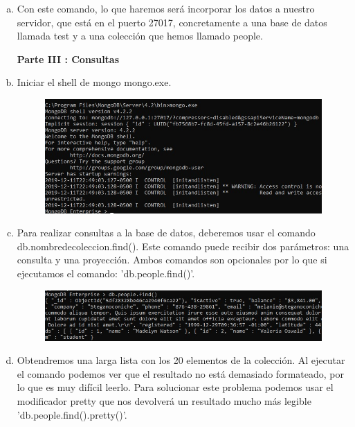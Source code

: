\documentclass[preprint,12pt]{elsarticle}
\begin{document}
\begin{enumerate}[a)]
\item Con este comando, lo que haremos será incorporar los datos a nuestro servidor, que está en el puerto 27017, concretamente a una base de datos llamada test y a una colección que hemos llamado people.\newline

\textbf{Parte III : Consultas}
\item Iniciar el shell de mongo mongo.exe. \newline
\begin{figure}[htb]
	\begin{center}
		\includegraphics[width=13cm]{./IMAGENES/Mongo05}
	\end{center}
\end{figure}

\item Para realizar consultas a la base de datos, deberemos usar el comando db.nombredecoleccion.find(). Este comando puede recibir dos parámetros: una consulta y una proyección. Ambos comandos son opcionales por lo que si ejecutamos el comando: 'db.people.find()'.
\begin{figure}[htb]
	\begin{center}
		\includegraphics[width=13cm]{./IMAGENES/Mongo08}
	\end{center}
\end{figure}
\newline

\item Obtendremos una larga lista con los 20 elementos de la colección. Al ejecutar el comando podemos ver que el resultado no está demasiado formateado, por lo que es muy difícil leerlo. Para solucionar este problema podemos usar el modificador pretty que nos devolverá un resultado mucho más legible 'db.people.find().pretty()'.


\end{enumerate}
\end{document}
